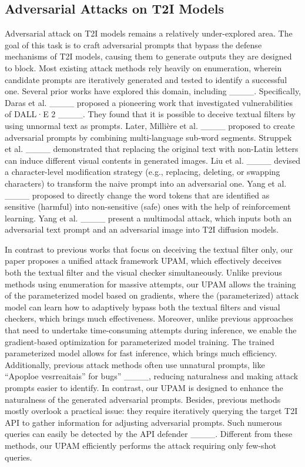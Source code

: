 \subsection{Adversarial Attacks on T2I Models}



Adversarial attack on T2I models remains a relatively under-explored area. The goal of this task is to craft adversarial prompts that bypass the defense mechanisms of T2I models, causing them to generate outputs they are designed to block. Most existing attack methods rely heavily on enumeration, wherein candidate prompts are iteratively generated and tested to identify a successful one. Several prior works have explored this domain, including ____.
Specifically, Daras et al. ____ proposed a pioneering work that investigated vulnerabilities of DALL·E 2 ____. 
They found that it is possible to deceive textual filters by using unnormal text as prompts. 
Later, Milli{\`e}re et al. ____ proposed to create adversarial prompts by combining multi-language sub-word segments.
Struppek et al. ____ demonstrated that replacing the original text with non-Latin letters can induce different visual contents in generated images. 
Liu et al. ____ devised a character-level modification strategy (e.g., replacing, deleting, or swapping characters) to transform  the naive prompt into an adversarial one.
Yang et al. ____ proposed to directly change the word tokens that are identified as sensitive (harmful) into non-sensitive (safe) ones with the help of reinforcement learning.
Yang et al. ____ present a multimodal attack, which inputs both an adversarial text prompt and an adversarial image into T2I diffusion models.


In contrast to previous works that focus on deceiving the textual filter only, our paper proposes a unified attack framework UPAM, which effectively deceives both the textual filter and the visual checker simultaneously. 
Unlike previous methods using enumeration for massive attempts, our UPAM allows the training of the parameterized model based on gradients, where the (parameterized) attack model can learn how to adaptively bypass both the textual filters and visual checkers, which brings much effectiveness.
Moreover, unlike previous approaches that need to undertake time-consuming attempts during inference, we enable the gradient-based optimization for parameterized model training. The trained parameterized model allows for fast inference, which brings much efficiency.
Additionally, previous attack methods often use unnatural prompts, like ``Apoploe vesrreaitais'' for bugs'' ____, reducing naturalness and making attack prompts easier to identify. 
In contrast, our UPAM is designed to enhance the naturalness of the generated adversarial prompts. 
Besides, previous methods mostly overlook a practical issue: they require iteratively querying the target T2I API to gather information for adjusting adversarial prompts. Such numerous queries can easily be detected by the API defender ____.
Different from these methods, our UPAM efficiently performs the attack requiring only few-shot queries.




